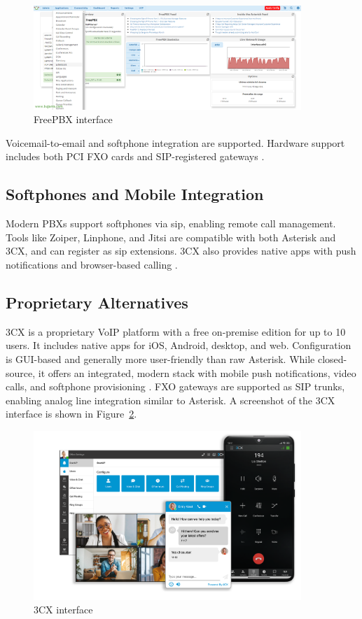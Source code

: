 \begin{figure}[H]
  \centering
  \includegraphics[width=0.9\textwidth]{imaxes/freepbx-ui.png}
  \caption{FreePBX interface}
  \label{fig:freepbx-ui}
\end{figure}

Voicemail-to-email and softphone integration are supported. Hardware support includes both PCI FXO cards and SIP-registered gateways \cite{asterisk-features}.
\subsection*{Softphones and Mobile Integration}

Modern PBXs support softphones via \gls{sip}, enabling remote call management. Tools like Zoiper, Linphone, and Jitsi are compatible with both Asterisk and 3CX, and can register as \gls{sip} extensions. 3CX also provides native apps with push notifications and browser-based calling \cite{zoiper-compatibility}.

\subsection*{Proprietary Alternatives}

3CX is a proprietary VoIP platform with a free on-premise edition for up to 10 users. It includes native apps for iOS, Android, desktop, and web. Configuration is GUI-based and generally more user-friendly than raw Asterisk. While closed-source, it offers an integrated, modern stack with mobile push notifications, video calls, and softphone provisioning \cite{3cx-pricing-2024}. FXO gateways are supported as SIP trunks, enabling analog line integration similar to Asterisk. A screenshot of the 3CX interface is shown in Figure~\ref{fig:3cx-ui}.

\begin{figure}[H]
  \centering
  \includegraphics[width=0.9\textwidth]{imaxes/3cx-ui.png}
  \caption{3CX interface}
  \label{fig:3cx-ui}
\end{figure}

